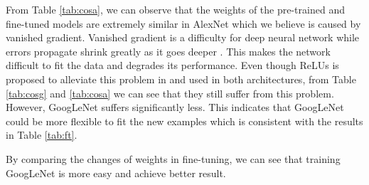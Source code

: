 From Table \ref{tab:cosa}, we can observe that the weights of the pre-trained and fine-tuned models are extremely similar in AlexNet which we believe is caused by vanished gradient.
Vanished gradient is a difficulty for deep neural network while errors propagate shrink greatly as it goes deeper \cite{glorot2010understanding}. This makes the network difficult to fit the data and degrades its performance. Even though ReLUs is proposed to alleviate this problem in \cite{NairH10} and used in both architectures,
from Table \ref{tab:cosg} and \ref{tab:cosa} we can see that they still suffer from this problem. However, GoogLeNet suffers significantly less. This indicates that GoogLeNet could be more flexible to fit the new examples which is consistent with the results in Table \ref{tab:ft}.

By comparing the changes of weights in fine-tuning, we can see that training GoogLeNet is more easy and achieve better result.

